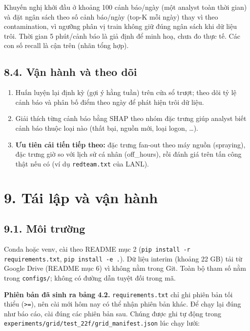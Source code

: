 \documentclass[
  11pt,
]{article}
\providecommand{\tightlist}{%
  \setlength{\itemsep}{0pt}\setlength{\parskip}{0pt}}
\begin{document}
Khuyến nghị khởi đầu ở khoảng 100 cảnh báo/ngày (một analyst toàn thời
gian) và đặt ngân sách theo số cảnh báo/ngày (top-K mỗi ngày) thay vì
theo contamination, vì ngưỡng phân vị train không giữ đúng ngân sách khi
dữ liệu trôi. Thời gian 5 phút/cảnh báo là giả định để minh hoạ, chưa đo
thực tế. Các con số recall là cận trên (nhãn tổng hợp).

\hypertarget{vux1eadn-huxe0nh-vuxe0-theo-duxf5i}{%
\subsection{8.4. Vận hành và theo
dõi}\label{vux1eadn-huxe0nh-vuxe0-theo-duxf5i}}

\begin{enumerate}
\def\labelenumi{\arabic{enumi}.}
\tightlist
\item
  Huấn luyện lại định kỳ (gợi ý hằng tuần) trên cửa sổ trượt; theo dõi
  tỷ lệ cảnh báo và phân bố điểm theo ngày để phát hiện trôi dữ liệu.
\item
  Giải thích từng cảnh báo bằng SHAP theo nhóm đặc trưng giúp analyst
  biết cảnh báo thuộc loại nào (thất bại, nguồn mới, loại logon,
  \ldots).
\item
  \textbf{Ưu tiên cải tiến tiếp theo:} đặc trưng fan-out theo máy nguồn
  (spraying), đặc trưng giờ so với lịch sử cá nhân
  (off\_\allowbreak{}hours), rồi đánh giá trên tấn công thật nếu có (ví
  dụ \texttt{redteam.\allowbreak{}txt} của LANL).
\end{enumerate}

\hypertarget{tuxe1i-lux1eadp-vuxe0-vux1eadn-huxe0nh}{%
\section{9. Tái lập và vận
hành}\label{tuxe1i-lux1eadp-vuxe0-vux1eadn-huxe0nh}}

\hypertarget{muxf4i-trux1b0ux1eddng}{%
\subsection{9.1. Môi trường}\label{muxf4i-trux1b0ux1eddng}}

Conda hoặc venv, cài theo README mục 2
(\texttt{pip install -r requirements.\allowbreak{}txt},
\texttt{pip install -e .\allowbreak{}}). Dữ liệu interim (khoảng 22 GB)
tải từ Google Drive (README mục 6) vì không nằm trong Git. Toàn bộ tham
số nằm trong \texttt{configs/\allowbreak{}}; không có đường dẫn tuyệt
đối trong mã.

\textbf{Phiên bản đã sinh ra bảng 4.2.}
\texttt{requirements.\allowbreak{}txt} chỉ ghi phiên bản tối thiểu
(\texttt{>=\allowbreak{}}), nên cài mới hôm nay có thể nhận phiên bản
khác. Để chạy lại đúng như báo cáo, cài đúng các phiên bản sau. Chúng
được ghi tự động trong
\texttt{experiments/\allowbreak{}grid/\allowbreak{}test\_\allowbreak{}22f/\allowbreak{}grid\_\allowbreak{}manifest.\allowbreak{}json}
lúc chạy lưới:
\end{document}
